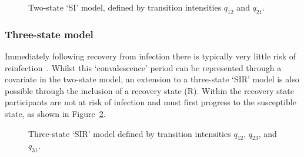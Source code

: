 \begin{figure}[htbp!]
    \centering
    \caption[Two-state `SI' model]{Two-state `SI' model, defined by transition intensities $q_{12}$ and $q_{21}$.}\label{fig:two-state-model}
\end{figure}

\subsubsection{Three-state model}

Immediately following recovery from infection there is typically very little risk of reinfection~\parencite{Hall2021-rh}. Whilst this `convalescence' period can be represented through a covariate in the two-state model, an extension to a three-state `SIR' model is also possible through the inclusion of a recovery state (R). Within the recovery state participants are not at risk of infection and must first progress to the susceptible state, as shown in Figure~\ref{fig:three-state-model}.

\begin{figure}[htbp!]
    \centering
    \caption[Three-state `SIR' model]{Three-state `SIR' model defined by transition intensities $q_{12}$, $q_{23}$, and $q_{31}$.}\label{fig:three-state-model}
\end{figure}

